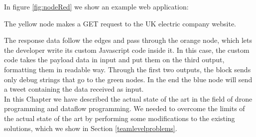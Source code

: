 In figure \ref{fig:nodeRed} we show an example web application:



The yellow node makes a GET request to the UK electric company website.

The response data follow the edges and pass through the orange node, which lets the developer write its custom Javascript code inside it. 
In this case, the custom code takes the payload data in input and put them on the third output, formatting them in readable way. 
Through the first two outputs, the block sends only debug strings that go to the green nodes.
In the end the blue node will send a tweet containing the data received as input.
\\

In this Chapter we have described the actual state of the art in the field of drone programming and dataflow programming.
We needed to overcome the limits of the actual state of the art by performing some modifications to the existing solutions, which we show in Section \ref{teamlevelproblems}.



